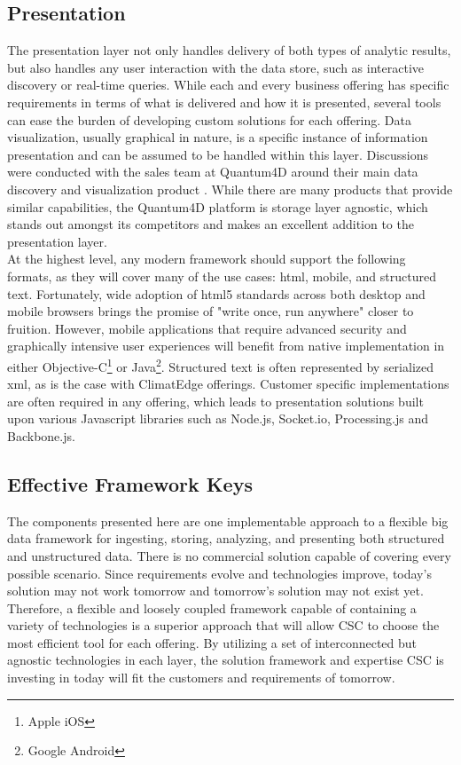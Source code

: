 \subsection{Presentation}
The presentation layer not only handles delivery of both types of analytic results, but also handles any user interaction with the data store, such as interactive discovery or real-time queries. While each and every business offering has specific requirements in terms of what is delivered and how it is presented, several tools can ease the burden of developing custom solutions for each offering. Data visualization, usually graphical in nature, is a specific instance of information presentation and can be assumed to be handled within this layer. Discussions were conducted with the sales team at Quantum4D around their main data discovery and visualization product \cite{quantum}. While there are many products that provide similar capabilities, the Quantum4D platform is storage layer agnostic, which stands out amongst its competitors and makes an excellent addition to the presentation layer.\\

At the highest level, any modern framework should support the following formats, as they will cover many of the use cases: \gls{html}, mobile, and structured text. Fortunately, wide adoption of \gls{html}5 standards across both desktop and mobile browsers brings the promise of "write once, run anywhere" closer to fruition. However, mobile applications that require advanced security and graphically intensive user experiences will benefit from native implementation in either Objective-C\footnote{Apple iOS} or Java\footnote{Google Android}. Structured text is often represented by serialized \gls{xml}, as is the case with ClimatEdge offerings. Customer specific implementations are often required in any offering, which leads to presentation solutions built upon various Javascript libraries such as Node.js, Socket.io, Processing.js and Backbone.js.
\subsection{Effective Framework Keys}
The components presented here are one implementable approach to a flexible big data framework for ingesting, storing, analyzing, and presenting both structured and unstructured data. There is no commercial solution capable of covering every possible scenario. Since requirements evolve and technologies improve, today's solution may not work tomorrow and tomorrow's solution may not exist yet. Therefore, a flexible and loosely coupled framework capable of containing a variety of technologies is a superior approach that will allow \textsc{CSC} to choose the most efficient tool for each offering. By utilizing a set of interconnected but agnostic technologies in each layer, the solution framework and expertise \textsc{CSC} is investing in today will fit the customers and requirements of tomorrow.
